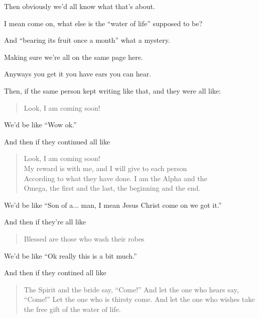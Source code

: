 {{                %

                Then obviously we'd all know what that's about.

                I mean come on, what else is the ``water of life'' supposed to be?

                And ``bearing its fruit once a month'' what a mystery.

                Making sure we're all on the same page here.

                Anyways you get it you have ears you can hear.

                Then, if the same person kept writing like that, and they were all like:


                \begin{quote}
                Look, I am coming soon!
                \end{quote}

                We'd be like ``Wow ok.''
                
                And then if they continued all like

                \begin{quote}
                Look, I am coming soon!\\
                My reward is with me, and I will give to each person\\
                According to what they have done. I am the Alpha and the\\
                Omega, the first and the last, the beginning and the end.
                \end{quote}

                We'd be like ``Son of a... man, I mean Jesus Christ come on we got it.''
                
                And then if they're all like

                \begin{quote}
                Blessed are those who wash their robes
                \end{quote}

                We'd be like ``Ok really this is a bit much.''
                
                And then if they contined all like

                \begin{quote}
                The Spirit and the bride say, ``Come!'' And let the one who hears say, ``Come!''
                Let the one who is thirsty come.
                And let the one who wishes take the free gift of the water of life.
                \end{quote}

}}
